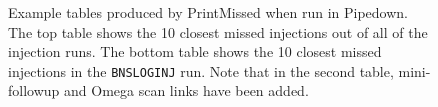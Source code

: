 \begin{figure}[p]
\center
{}
\label{fig:sample-printmissed}
\caption{Example tables produced by PrintMissed when run in Pipedown. The top table shows the 10 closest missed injections out of all of the injection runs. The bottom table shows the 10 closest missed injections in the \texttt{BNSLOGINJ} run. Note that in the second table, mini-followup and Omega scan links have been added.}
\end{figure}

